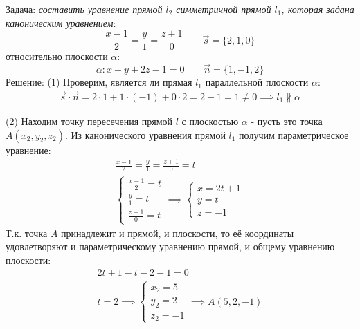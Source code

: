 \begin{eg}
  Задача: \textit{составить уравнение прямой $l_2$ симметричной прямой $l_1$, которая задана каноническим уравнением}: \[
  \frac{x - 1}{2} = \frac{y}{1} = \frac{z + 1}{0} \qquad \vec{s} = \{2, 1, 0\} 
  \] 
  относительно плоскости $\alpha$: \[
    \alpha: x - y + 2z - 1 = 0 \qquad \vec{n} = \{1, -1, 2\} 
  \] 
  Решение:
  (1) Проверим, является ли прямая $l_1$ параллельной плоскости $\alpha$:
  \begin{gather*}
    \vec{s} \cdot \vec{n} = 2 \cdot 1 + 1 \cdot (-1) + 0 \cdot 2 = 2 - 1 = 1 \neq 0 \implies l_1 \not \parallel \alpha
  \end{gather*}

  (2) Находим точку пересечения прямой $l$ с плоскостью $\alpha$ - пусть это точка $A(x_2, y_2, z_2)$.
  Из канонического уравнения прямой $l_1$ получим параметрическое уравнение:
  \begin{gather*}
    \frac{x - 1}{2} = \frac{y}{1} = \frac{z + 1}{0} = t \\
    \begin{cases}
      \frac{x - 1}{2} = t \\
      \frac{y}{1} = t \\
      \frac{z + 1}{0} = t
    \end{cases} \implies
    \begin{cases}
      x = 2t + 1 \\
      y = t \\
      z = -1
    \end{cases}
  \end{gather*}
  Т.к. точка $A$ принадлежит и прямой, и плоскости, то её координаты удовлетворяют и параметрическому уравнению прямой, и общему уравнению плоскости:
  \begin{gather*}
    2t + 1 - t - 2 - 1 = 0 \\
    t = 2 \implies \begin{cases}
      x_2 = 5 \\
      y_2 = 2 \\
      z_2 = -1
    \end{cases} \implies A(5, 2, -1)
  \end{gather*}


\end{eg}
